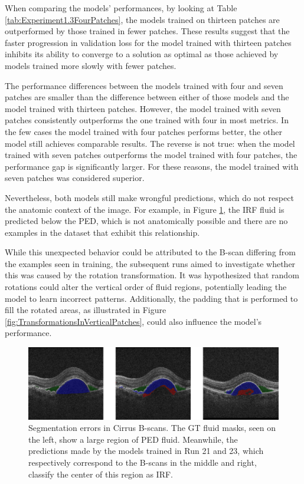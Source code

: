 When comparing the models' performances, by looking at Table \ref{tab:Experiment1.3FourPatches}, the models trained on thirteen patches are outperformed by those trained in fewer patches. These results suggest that the faster progression in validation loss for the model trained with thirteen patches inhibits its ability to converge to a solution as optimal as those achieved by models trained more slowly with fewer patches.
\par
The performance differences between the models trained with four and seven patches are smaller than the difference between either of those models and the model trained with thirteen patches. However, the model trained with seven patches consistently outperforms the one trained with four in most metrics. In the few cases the model trained with four patches performs better, the other model still achieves comparable results. The reverse is not true: when the model trained with seven patches outperforms the model trained with four patches, the performance gap is significantly larger. For these reasons, the model trained with seven patches was considered superior.
\par
Nevertheless, both models still make wrongful predictions, which do not respect the anatomic context of the image. For example, in Figure \ref{fig:CirrusSegmentationErrors}, the IRF fluid is predicted below the PED, which is not anatomically possible and there are no examples in the dataset that exhibit this relationship.
\par
While this unexpected behavior could be attributed to the B-scan differing from the examples seen in training, the subsequent runs aimed to investigate whether this was caused by the rotation transformation. It was hypothesized that random rotations could alter the vertical order of fluid regions, potentially leading the model to learn incorrect patterns. Additionally, the padding that is performed to fill the rotated areas, as illustrated in Figure \ref{fig:TransformationsInVerticalPatches}, could also influence the model's performance.

\begin{figure}[!ht]
	\centering
	\includegraphics[width=1.0\linewidth]{figures/CirrusSegmentationErrors.png}
	\caption{Segmentation errors in Cirrus B-scans. The GT fluid masks, seen on the left, show a large region of PED fluid. Meanwhile, the predictions made by the models trained in Run 21 and 23, which respectively correspond to the B-scans in the middle and right, classify the center of this region as IRF.}
	\label{fig:CirrusSegmentationErrors}
\end{figure}

